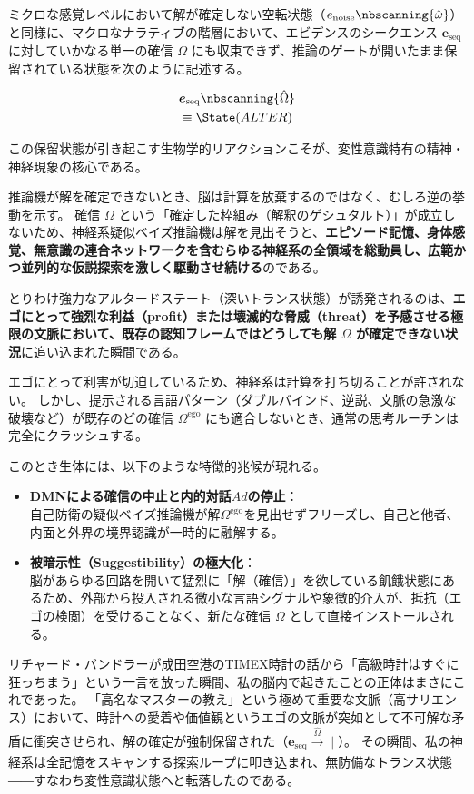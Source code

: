 ミクロな感覚レベルにおいて解が確定しない空転状態（$e_{\mathrm{noise}} \nbscanning{\hat{\omega}} $）と同様に、マクロなナラティブの階層において、エビデンスのシークエンス $\boldsymbol{e}_{\mathrm{seq}}$ に対していかなる単一の確信 $\Omega$ にも収束できず、推論のゲートが開いたまま保留されている状態を次のように記述する。

\begin{align}
    &\boldsymbol{e}_{\mathrm{seq}} \nbscanning{\hat{\Omega}} \\
    &\equiv \State(ALTER)
    \label{eq:asc_definition}
\end{align}

この保留状態が引き起こす生物学的リアクションこそが、変性意識特有の精神・神経現象の核心である。

推論機が解を確定できないとき、脳は計算を放棄するのではなく、むしろ逆の挙動を示す。
確信 $\Omega$ という「確定した枠組み（解釈のゲシュタルト）」が成立しないため、神経系疑似ベイズ推論機は解を見出そうと、\textbf{エピソード記憶、身体感覚、無意識の連合ネットワークを含むらゆる神経系の全領域を総動員し、広範かつ並列的な仮説探索を激しく駆動させ続ける}のである。

とりわけ強力なアルタードステート（深いトランス状態）が誘発されるのは、\textbf{エゴにとって強烈な利益（profit）または壊滅的な脅威（threat）を予感させる極限の文脈において、既存の認知フレームではどうしても解 $\Omega$ が確定できない状況}に追い込まれた瞬間である。

エゴにとって利害が切迫しているため、神経系は計算を打ち切ることが許されない。
しかし、提示される言語パターン（ダブルバインド、逆説、文脈の急激な破壊など）が既存のどの確信 $\Omega^{\mathrm{ego}}$ にも適合しないとき、通常の思考ルーチンは完全にクラッシュする。

このとき生体には、以下のような特徴的兆候が現れる。
\begin{itemize}
  \item \textbf{DMNによる確信の中止と内的対話$Ad$の停止}：\\
      自己防衛の疑似ベイズ推論機が解$\Omega^{\mathrm{ego}}$を見出せずフリーズし、自己と他者、内面と外界の境界認識が一時的に融解する。
  \item \textbf{被暗示性（Suggestibility）の極大化}：\\
  脳があらゆる回路を開いて猛烈に「解（確信）」を欲している飢餓状態にあるため、外部から投入される微小な言語シグナルや象徴的介入が、抵抗（エゴの検閲）を受けることなく、新たな確信 $\Omega$ として直接インストールされる。
\end{itemize}

リチャード・バンドラーが成田空港のTIMEX時計の話から「高級時計はすぐに狂っちまう」という一言を放った瞬間、私の脳内で起きたことの正体はまさにこれであった。
「高名なマスターの教え」という極めて重要な文脈（高サリエンス）において、時計への愛着や価値観というエゴの文脈が突如として不可解な矛盾に衝突させられ、解の確定が強制保留された（$\boldsymbol{e}_{\mathrm{seq}} \xrightarrow[]{\hat{\Omega}} \mid$）。
その瞬間、私の神経系は全記憶をスキャンする探索ループに叩き込まれ、無防備なトランス状態――すなわち変性意識状態へと転落したのである。


